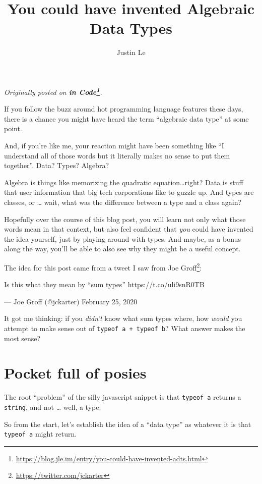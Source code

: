 \documentclass[]{article}
\title{You could have invented Algebraic Data Types}
\author{Justin Le}
\renewcommand{\href}[2]{#2\footnote{\url{#1}}}
\begin{document}
\maketitle

\emph{Originally posted on
\textbf{\href{https://blog.jle.im/entry/you-could-have-invented-adts.html}{in
Code}}.}

If you follow the buzz around hot programming language features these days,
there is a chance you might have heard the term ``algebraic data type'' at some
point.

And, if you're like me, your reaction might have been something like ``I
understand all of those words but it literally makes no sense to put them
together''. Data? Types? Algebra?

Algebra is things like memorizing the quadratic equation\ldots right? Data is
stuff that user information that big tech corporations like to guzzle up. And
types are classes, or \ldots{} wait, what was the difference between a type and
a class again?

Hopefully over the course of this blog post, you will learn not only what those
words mean in that context, but also feel confident that \emph{you} could have
invented the idea yourself, just by playing around with types. And maybe, as a
bonus along the way, you'll be able to also see why they might be a useful
concept.

The idea for this post came from a tweet I saw from
\href{https://twitter.com/jckarter}{Joe Groff}:

Is this what they mean by ``sum types'' https://t.co/uli9snR0TB

--- Joe Groff (@jckarter) February 25, 2020

It got me thinking: if you \emph{didn't} know what sum types where, how
\emph{would} you attempt to make sense out of \texttt{typeof\ a\ +\ typeof\ b}?
What answer makes the most sense?

\hypertarget{pocket-full-of-posies}{%
\section{Pocket full of posies}\label{pocket-full-of-posies}}

The root ``problem'' of the silly javascript snippet is that \texttt{typeof\ a}
returns a \texttt{string}, and not \ldots{} well, a type.

So from the start, let's establish the idea of a ``data type'' as whatever it is
that \texttt{typeof\ a} might return.
\end{document}
